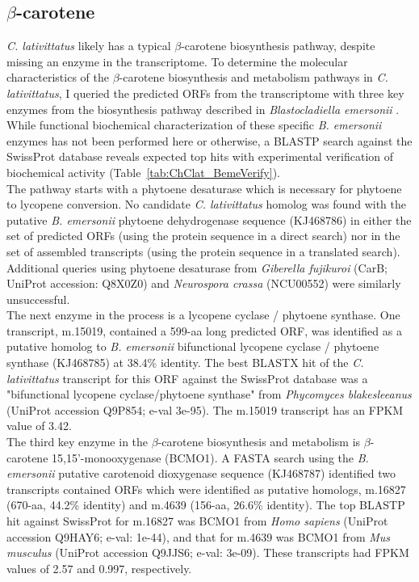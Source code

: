 \subsection{$\beta$-carotene} 
\textit{C. lativittatus} likely has a typical $\beta$-carotene biosynthesis pathway, despite missing an enzyme in the transcriptome. To determine the molecular characteristics of the $\beta$-carotene biosynthesis and metabolism pathways in \textit{C. lativittatus}, I queried the predicted ORFs from the transcriptome with three key enzymes from the biosynthesis pathway described in \textit{Blastocladiella emersonii} \cite{Avelar2014}. While functional biochemical characterization of these specific \textit{B. emersonii} enzymes has not been performed here or otherwise, a BLASTP search against the SwissProt database reveals expected top hits with experimental verification of biochemical activity (Table~\ref{tab:ChClat_BemeVerify}). \\
\indent The pathway starts with a phytoene desaturase which is necessary for phytoene to lycopene conversion. No candidate \textit{C. lativittatus} homolog was found with the putative \textit{B. emersonii} phytoene dehydrogenase sequence (KJ468786) in either the set of predicted ORFs (using the protein sequence in a direct search) nor in the set of assembled transcripts (using the protein sequence in a translated search). Additional queries using phytoene desaturase from \textit{Giberella fujikuroi} (CarB; UniProt accession: Q8X0Z0) and \textit{Neurospora crassa} (NCU00552) were similarly unsuccessful. \\
\indent The next enzyme in the process is a lycopene cyclase / phytoene synthase. One transcript, m.15019, contained a 599-aa long predicted ORF, was identified as a putative homolog to \textit{B. emersonii} bifunctional lycopene cyclase / phytoene synthase (KJ468785) at 38.4\% identity. The best BLASTX hit of the \textit{C. lativittatus} transcript for this ORF against the SwissProt database was a "bifunctional lycopene cyclase/phytoene synthase" from\textit{ Phycomyces blakesleeanus} (UniProt accession Q9P854; e-val 3e-95). The m.15019 transcript has an FPKM value of 3.42. \\
\indent The third key enzyme in the $\beta$-carotene biosynthesis and metabolism is $\beta$-carotene 15,15'-monooxygenase (BCMO1). A FASTA search using the \textit{B. emersonii} putative carotenoid dioxygenase sequence (KJ468787) identified two transcripts contained ORFs which were identified as putative homologs, m.16827 (670-aa, 44.2\% identity) and m.4639 (156-aa, 26.6\% identity). The top BLASTP hit against SwissProt for m.16827 was BCMO1 from \textit{Homo sapiens} (UniProt accession Q9HAY6; e-val: 1e-44), and that for m.4639 was BCMO1 from \textit{Mus musculus} (UniProt accession Q9JJS6; e-val: 3e-09). These transcripts had FPKM values of 2.57 and 0.997, respectively. \\
